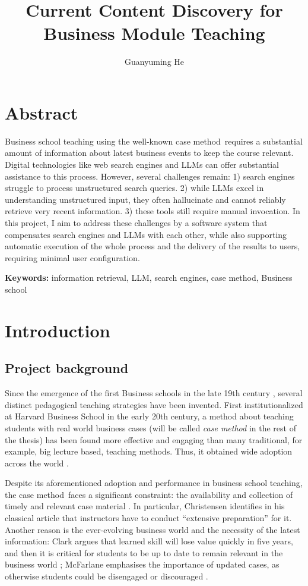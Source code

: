 \documentclass[final-report]{report-template}
\title{Current Content Discovery for Business Module Teaching}
\author{Guanyuming He}
\newcommand\casemethod{case method}
\begin{document}
\maketitlepage  

\section*{Abstract}
Business school teaching using the well-known \casemethod\ requires a
substantial amount of information about latest business events to keep the
course relevant.  Digital technologies like web search engines and LLMs can
offer substantial assistance to this process. However, several challenges
remain: 1) search engines struggle to process unstructured search queries. 2)
while LLMs excel in understanding unstructured input, they often hallucinate
and cannot reliably retrieve very recent information. 3) these tools still
require manual invocation. In this project, I aim to address these challenges
by a software system that compensates search engines and LLMs with each other,
while also supporting automatic execution of the whole process and the delivery
of the results to users, requiring minimal user configuration.

\textbf{Keywords:} information retrieval, LLM, search
engines, \casemethod, Business school

\section{Introduction}
\subsection{Project background} \label{sec.proj.bg}
Since the emergence of the first Business schools in the late 19th century
\cite{first.bis.school.1, first.bis.school.2}, several distinct pedagogical
teaching strategies have been invented.  First institutionalized at Harvard
Business School \cite{case.method.origin.1, case.method.origin.2} in the early
20th century, a method about teaching students with real world business cases
(will be called \emph{\casemethod} in the rest of the thesis) has been found
more effective and engaging \cite{case.method.support.1, case.method.support.2,
case.method.support.3} than many traditional, for example, big lecture based,
teaching methods. Thus, it obtained wide adoption across the world
\cite{case.method.adoption.1, case.method.adoption.2}.

Despite its aforementioned adoption and performance in business school
teaching, the \casemethod\ faces a significant constraint: the availability and
collection of timely and relevant case material \cite{case.method.limit.1,
case.method.limit.3}. In particular, Christensen identifies in his classical
article that instructors have to conduct ``extensive preparation''
\cite{case.method.limit.2} for it. Another reason is the ever-evolving business
world and the necessity of the latest information: Clark argues that learned
skill will lose value quickly in five years, and then it is critical for
students to be up to date to remain relevant in the business world
\cite{case.method.limit.4}; McFarlane emphasises the importance of updated
cases, as otherwise students could be disengaged or discouraged
\cite{case.method.limit.5}.
\end{document}
